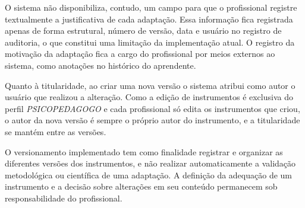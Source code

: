 O sistema não disponibiliza, contudo, um campo para que o profissional registre textualmente a justificativa de cada adaptação. Essa informação fica registrada apenas de forma estrutural, número de versão, data e usuário no registro de auditoria, o que constitui uma limitação da implementação atual. O registro da motivação da adaptação fica a cargo do profissional por meios externos ao sistema, como anotações no histórico do aprendente.

Quanto à titularidade, ao criar uma nova versão o sistema atribui como autor o usuário que realizou a alteração. Como a edição de instrumentos é exclusiva do perfil \textit{PSICOPEDAGOGO} e cada profissional só edita os instrumentos que criou, o autor da nova versão é sempre o próprio autor do instrumento, e a titularidade se mantém entre as versões.

O versionamento implementado tem como finalidade registrar e organizar as diferentes versões dos instrumentos, e não realizar automaticamente a validação metodológica ou científica de uma adaptação. A definição da adequação de um instrumento e a decisão sobre alterações em seu conteúdo permanecem sob responsabilidade do profissional.